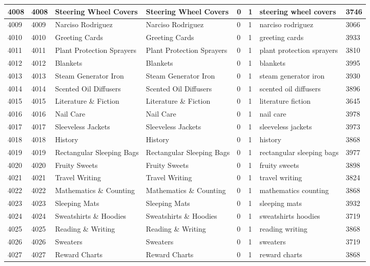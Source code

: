 \begin{longtable}{|l|l|l|l|l|l|l|l|}
4008 & 4008 & Steering Wheel Covers & Steering Wheel Covers & 0 & 1 & steering wheel covers & 3746 \\ \hline 
4009 & 4009 & Narciso Rodriguez & Narciso Rodriguez & 0 & 1 & narciso rodriguez & 3066 \\ \hline 
4010 & 4010 & Greeting Cards & Greeting Cards & 0 & 1 & greeting cards & 3933 \\ \hline 
4011 & 4011 & Plant Protection Sprayers & Plant Protection Sprayers & 0 & 1 & plant protection sprayers & 3810 \\ \hline 
4012 & 4012 & Blankets & Blankets & 0 & 1 & blankets & 3995 \\ \hline 
4013 & 4013 & Steam Generator Iron & Steam Generator Iron & 0 & 1 & steam generator iron & 3930 \\ \hline 
4014 & 4014 & Scented Oil Diffusers & Scented Oil Diffusers & 0 & 1 & scented oil diffusers & 3896 \\ \hline 
4015 & 4015 & Literature \& Fiction & Literature \& Fiction & 0 & 1 & literature fiction & 3645 \\ \hline 
4016 & 4016 & Nail Care & Nail Care & 0 & 1 & nail care & 3978 \\ \hline 
4017 & 4017 & Sleeveless Jackets & Sleeveless Jackets & 0 & 1 & sleeveless jackets & 3973 \\ \hline 
4018 & 4018 & History & History & 0 & 1 & history & 3868 \\ \hline 
4019 & 4019 & Rectangular Sleeping Bags & Rectangular Sleeping Bags & 0 & 1 & rectangular sleeping bags & 3977 \\ \hline 
4020 & 4020 & Fruity Sweets & Fruity Sweets & 0 & 1 & fruity sweets & 3898 \\ \hline 
4021 & 4021 & Travel Writing & Travel Writing & 0 & 1 & travel writing & 3824 \\ \hline 
4022 & 4022 & Mathematics \& Counting & Mathematics \& Counting & 0 & 1 & mathematics counting & 3868 \\ \hline 
4023 & 4023 & Sleeping Mats & Sleeping Mats & 0 & 1 & sleeping mats & 3932 \\ \hline 
4024 & 4024 & Sweatshirts \& Hoodies & Sweatshirts \& Hoodies & 0 & 1 & sweatshirts hoodies & 3719 \\ \hline 
4025 & 4025 & Reading \& Writing & Reading \& Writing & 0 & 1 & reading writing & 3868 \\ \hline 
4026 & 4026 & Sweaters & Sweaters & 0 & 1 & sweaters & 3719 \\ \hline 
4027 & 4027 & Reward Charts & Reward Charts & 0 & 1 & reward charts & 3868 \\ \hline 

\end{longtable}
